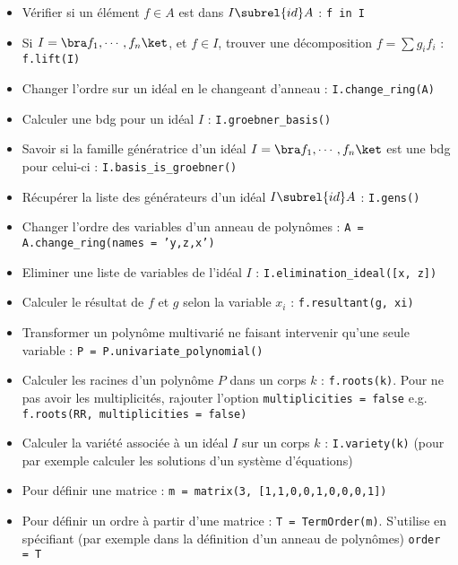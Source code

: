 \begin{itemize}
            \item Vérifier si un élément $f \in A$ est dans $I \subrel{id} A$ : \texttt{f in I}
            \item Si $I = \bra f_1, \cdots, f_n \ket$, et $f \in I$, trouver une décomposition $f = \sum g_if_i$ : \texttt{f.lift(I)}
            \item Changer l'ordre sur un idéal en le changeant d'anneau : \texttt{I.change_ring(A)}
            \item Calculer une bdg pour un idéal $I$ : \texttt{I.groebner_basis()}
            \item Savoir si la famille génératrice d'un idéal $I = \bra f_1, \cdots, f_n \ket$ est une bdg pour celui-ci : \texttt{I.basis_is_groebner()}
            \item Récupérer la liste des générateurs d'un idéal $I \subrel{id} A$ : \texttt{I.gens()}
            \item Changer l'ordre des variables d'un anneau de polynômes : \texttt{A = A.change_ring(names = 'y,z,x')}
            \item Eliminer une liste de variables de l'idéal $I$ : \texttt{I.elimination_ideal([x, z])}
            \item Calculer le résultat de $f$ et $g$ selon la variable $x_i$ : \texttt{f.resultant(g, xi)}
            \item Transformer un polynôme multivarié ne faisant intervenir qu'une seule variable : \texttt{P = P.univariate_polynomial()}
            \item Calculer les racines d'un polynôme $P$ dans un corps $k$ : \texttt{f.roots(k)}. Pour ne pas avoir les multiplicités, rajouter l'option \texttt{multiplicities = false} e.g. \linebreak \texttt{f.roots(RR, multiplicities = false)}
            \item Calculer la variété associée à un idéal $I$ sur un corps $k$ : \texttt{I.variety(k)} (pour par exemple calculer les solutions d'un système d'équations)
            \item Pour définir une matrice : \texttt{m = matrix(3, [1,1,0,0,1,0,0,0,1])}
            \item Pour définir un ordre à partir d'une matrice : \texttt{T = TermOrder(m)}. S'utilise en spécifiant (par exemple dans la définition d'un anneau de polynômes) \texttt{order = T}
        \end{itemize}